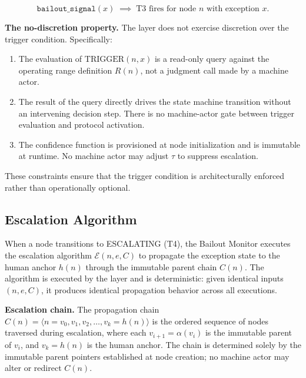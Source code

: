 \begin{equation}
\texttt{bailout\_signal}(x) \;\implies\; \text{T3 fires for node } n \text{ with exception } x. \tag{TC-secondary}
\end{equation}

\bigskip
\noindent\textbf{The no-discretion property.} The \bounds{} layer does not exercise discretion over the trigger condition. Specifically:

\begin{enumerate}
    \item The evaluation of $\text{TRIGGER}(n, x)$ is a read-only query against the operating range definition $R(n)$, not a judgment call made by a machine actor.
    \item The result of the query directly drives the state machine transition without an intervening decision step. There is no machine-actor gate between trigger evaluation and protocol activation.
    \item The confidence function is provisioned at node initialization and is immutable at runtime. No machine actor may adjust $\tau$ to suppress escalation.
\end{enumerate}

These constraints ensure that the trigger condition is architecturally enforced rather than operationally optional.

\subsection{Escalation Algorithm}\label{sec:escalation-algorithm}

When a node transitions to ESCALATING (T4), the Bailout Monitor executes the escalation algorithm $\mathcal{E}(n, e, C)$ to propagate the exception state to the human anchor $h(n)$ through the immutable parent chain $C(n)$. The algorithm is executed by the \fact{} layer and is deterministic: given identical inputs $(n, e, C)$, it produces identical propagation behavior across all executions.

\bigskip
\noindent\textbf{Escalation chain.} The propagation chain $C(n) = \langle n = v_0, v_1, v_2, \dots, v_k = h(n) \rangle$ is the ordered sequence of nodes traversed during escalation, where each $v_{i+1} = \alpha(v_i)$ is the immutable parent of $v_i$, and $v_k = h(n)$ is the human anchor. The chain is determined solely by the immutable parent pointers established at node creation; no machine actor may alter or redirect $C(n)$.

